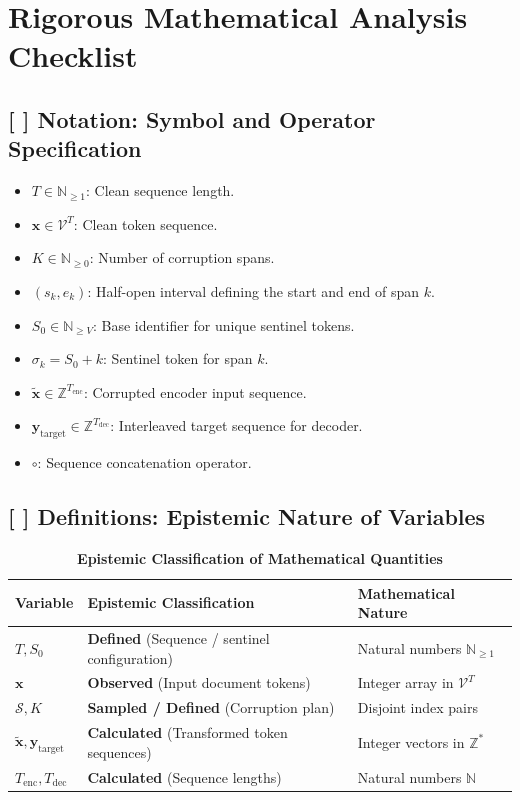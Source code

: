 \documentclass[11pt,a4paper]{article}
\theoremstyle{definition}
\begin{document}
\section{Rigorous Mathematical Analysis Checklist}

\subsection{[ ] Notation: Symbol and Operator Specification}
\begin{itemize}
    \item $T \in \mathbb{N}_{\ge 1}$: Clean sequence length.
    \item $\mathbf{x} \in \mathcal{V}^T$: Clean token sequence.
    \item $K \in \mathbb{N}_{\ge 0}$: Number of corruption spans.
    \item $(s_k, e_k)$: Half-open interval defining the start and end of span $k$.
    \item $S_0 \in \mathbb{N}_{\ge V}$: Base identifier for unique sentinel tokens.
    \item $\sigma_k = S_0 + k$: Sentinel token for span $k$.
    \item $\tilde{\mathbf{x}} \in \mathbb{Z}^{T_{\text{enc}}}$: Corrupted encoder input sequence.
    \item $\mathbf{y}_{\text{target}} \in \mathbb{Z}^{T_{\text{dec}}}$: Interleaved target sequence for decoder.
    \item $\circ$: Sequence concatenation operator.
\end{itemize}

\subsection{[ ] Definitions: Epistemic Nature of Variables}
\begin{table}[h]
\centering
\caption{\textbf{Epistemic Classification of Mathematical Quantities}}
\begin{tabular}{lll}
\toprule
\textbf{Variable} & \textbf{Epistemic Classification} & \textbf{Mathematical Nature} \\
\midrule
$T, S_0$ & \textbf{Defined} (Sequence / sentinel configuration) & Natural numbers $\mathbb{N}_{\ge 1}$ \\
$\mathbf{x}$ & \textbf{Observed} (Input document tokens) & Integer array in $\mathcal{V}^T$ \\
$\mathcal{S}, K$ & \textbf{Sampled / Defined} (Corruption plan) & Disjoint index pairs \\
$\tilde{\mathbf{x}}, \mathbf{y}_{\text{target}}$ & \textbf{Calculated} (Transformed token sequences) & Integer vectors in $\mathbb{Z}^*$ \\
$T_{\text{enc}}, T_{\text{dec}}$ & \textbf{Calculated} (Sequence lengths) & Natural numbers $\mathbb{N}$ \\
\bottomrule
\end{tabular}
\end{table}
\end{document}
